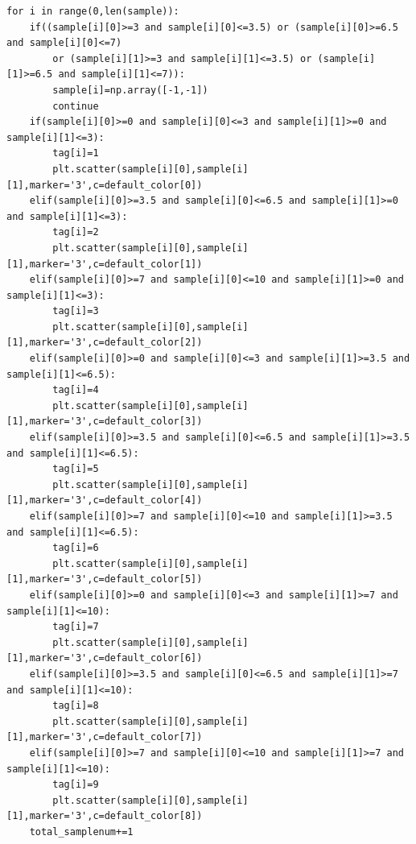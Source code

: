 \documentclass{article}
\begin{document}
\begin{verbatim}
for i in range(0,len(sample)):
    if((sample[i][0]>=3 and sample[i][0]<=3.5) or (sample[i][0]>=6.5 and sample[i][0]<=7)
        or (sample[i][1]>=3 and sample[i][1]<=3.5) or (sample[i][1]>=6.5 and sample[i][1]<=7)):
        sample[i]=np.array([-1,-1])
        continue
    if(sample[i][0]>=0 and sample[i][0]<=3 and sample[i][1]>=0 and sample[i][1]<=3):
        tag[i]=1
        plt.scatter(sample[i][0],sample[i][1],marker='3',c=default_color[0])
    elif(sample[i][0]>=3.5 and sample[i][0]<=6.5 and sample[i][1]>=0 and sample[i][1]<=3):
        tag[i]=2
        plt.scatter(sample[i][0],sample[i][1],marker='3',c=default_color[1])
    elif(sample[i][0]>=7 and sample[i][0]<=10 and sample[i][1]>=0 and sample[i][1]<=3):
        tag[i]=3
        plt.scatter(sample[i][0],sample[i][1],marker='3',c=default_color[2])
    elif(sample[i][0]>=0 and sample[i][0]<=3 and sample[i][1]>=3.5 and sample[i][1]<=6.5):
        tag[i]=4
        plt.scatter(sample[i][0],sample[i][1],marker='3',c=default_color[3])
    elif(sample[i][0]>=3.5 and sample[i][0]<=6.5 and sample[i][1]>=3.5 and sample[i][1]<=6.5):
        tag[i]=5
        plt.scatter(sample[i][0],sample[i][1],marker='3',c=default_color[4])
    elif(sample[i][0]>=7 and sample[i][0]<=10 and sample[i][1]>=3.5 and sample[i][1]<=6.5):
        tag[i]=6
        plt.scatter(sample[i][0],sample[i][1],marker='3',c=default_color[5])
    elif(sample[i][0]>=0 and sample[i][0]<=3 and sample[i][1]>=7 and sample[i][1]<=10):
        tag[i]=7
        plt.scatter(sample[i][0],sample[i][1],marker='3',c=default_color[6])
    elif(sample[i][0]>=3.5 and sample[i][0]<=6.5 and sample[i][1]>=7 and sample[i][1]<=10):
        tag[i]=8
        plt.scatter(sample[i][0],sample[i][1],marker='3',c=default_color[7])
    elif(sample[i][0]>=7 and sample[i][0]<=10 and sample[i][1]>=7 and sample[i][1]<=10):
        tag[i]=9
        plt.scatter(sample[i][0],sample[i][1],marker='3',c=default_color[8])
    total_samplenum+=1




\end{verbatim}
\end{document}
